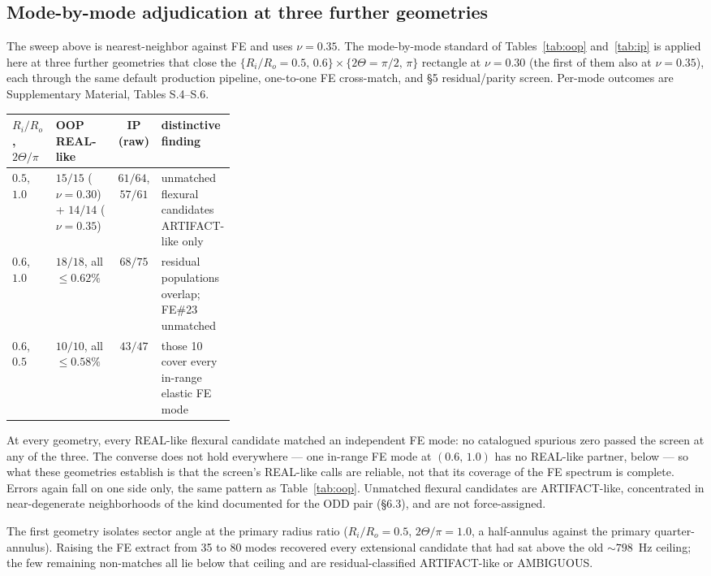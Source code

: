 \documentclass[11pt]{article}
\begin{document}
\subsection{Mode-by-mode adjudication at three further geometries}
\label{sec:r150a100}\label{sec:r200a100}\label{sec:r200a50}
The sweep above is nearest-neighbor against FE and uses $\nu=0.35$.
The mode-by-mode standard of Tables~\ref{tab:oop} and~\ref{tab:ip} is
applied here at three further geometries that close the
$\{R_i/R_o=0.5,\,0.6\}\times\{2\Theta=\pi/2,\,\pi\}$ rectangle at
$\nu=0.30$ (the first of them also at $\nu=0.35$), each through the
same default production pipeline, one-to-one FE cross-match, and
\S5 residual/parity screen. Per-mode outcomes are Supplementary
Material, Tables S.4--S.6.

\begin{center}\footnotesize
\begin{tabular}{@{}llc>{\raggedright\arraybackslash}p{0.32\linewidth}@{}}
\hline
$R_i/R_o$, $2\Theta/\pi$ & OOP REAL-like & IP (raw) & distinctive finding \\
\hline
$0.5$, $1.0$ & $15/15$ ($\nu{=}0.30$) + $14/14$ ($\nu{=}0.35$)
  & $61/64$, $57/61$ & unmatched flexural candidates ARTIFACT-like only \\
$0.6$, $1.0$ & $18/18$, all $\le 0.62\%$
  & $68/75$ & residual populations overlap; FE\#23 unmatched \\
$0.6$, $0.5$ & $10/10$, all $\le 0.58\%$
  & $43/47$ & those 10 cover every in-range elastic FE mode \\
\hline
\end{tabular}
\end{center}

\noindent At every geometry, every REAL-like flexural candidate matched
an independent FE mode: no catalogued spurious zero passed the screen at
any of the three. The converse does not hold everywhere --- one in-range
FE mode at $(0.6,\,1.0)$ has no REAL-like partner, below --- so what these
geometries establish is that the screen's REAL-like calls are reliable,
not that its coverage of the FE spectrum is complete. Errors again fall on
one side only, the same pattern as Table~\ref{tab:oop}. Unmatched flexural
candidates are ARTIFACT-like, concentrated in near-degenerate
neighborhoods of the kind documented for the ODD pair (\S6.3), and are
not force-assigned.

The first geometry isolates sector angle at the primary radius ratio
($R_i/R_o=0.5$, $2\Theta/\pi=1.0$, a half-annulus against the primary
quarter-annulus). Raising the FE extract from 35 to 80 modes recovered
every extensional candidate that had sat above the old ${\sim}798$~Hz
ceiling; the few remaining non-matches all lie below that ceiling and
are residual-classified ARTIFACT-like or AMBIGUOUS.
\end{document}

